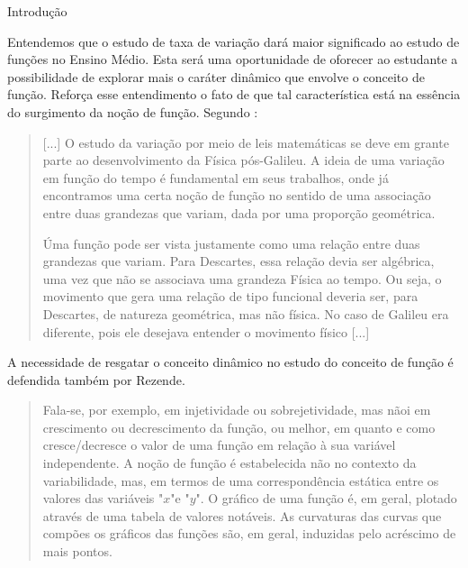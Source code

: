 \mainmatter

\begin{apresentacao}{Introdução}

Entendemos que o estudo de taxa de variação dará maior significado ao estudo de funções no Ensino Médio. Esta será uma oportunidade de oforecer ao estudante a possibilidade de explorar mais o caráter dinâmico que envolve o conceito de função. Reforça esse entendimento o fato de que tal característica está na essência do surgimento da noção de função. Segundo \cite{roque2012}:

\vspace{-1.5\parskip}
\begin{quote}
[...] O estudo da variação por meio de leis matemáticas se deve em grante parte ao desenvolvimento da Física pós-Galileu. A ideia de uma variação em função do tempo é fundamental em seus trabalhos, onde já encontramos uma certa noção de função no sentido de uma associação entre duas grandezas que variam, dada por uma proporção geométrica. 

Úma função pode ser vista justamente como uma relação entre duas grandezas que variam. Para Descartes, essa relação devia ser algébrica, uma vez que não se associava uma grandeza Física ao tempo. Ou seja, o movimento que gera uma relação de tipo funcional deveria ser, para Descartes, de natureza geométrica, mas não física. No caso de Galileu era diferente, pois ele desejava entender o movimento físico [...]
\flushright

\vspace{-.5\parskip}
\citep[p. 336]{roque2012}
\end{quote}
\vspace{-1.5\parskip}

A necessidade de resgatar o conceito dinâmico no estudo do conceito de função é defendida também por Rezende.

\vspace{-1.5\parskip}
\begin{quote}
Fala-se, por exemplo, em injetividade ou sobrejetividade, mas nãoi em crescimento ou decrescimento da função, ou melhor, em quanto e como cresce/decresce o valor de uma função em relação à sua variável independente. A noção de função é estabelecida não no contexto da variabilidade, mas, em termos de uma correspondência estática entre os valores das variáveis "$x$"{}e "$y$". O gráfico de uma função é, em geral, plotado através de uma tabela de valores notáveis. As curvaturas das curvas que compões os gráficos das funções são, em geral, induzidas pelo acréscimo de mais pontos.
\flushright


\end{quote}
\end{apresentacao}
